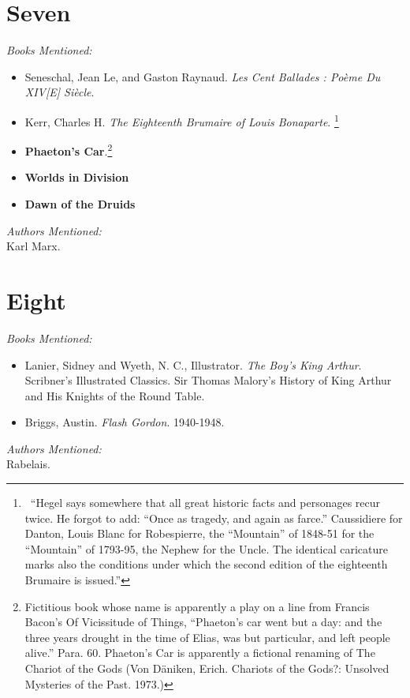 \documentclass[12pt,makeidx]{extreport}
\begin{document}
\section{Seven}
\textit{Books Mentioned:}
\begin{itemize}
\item Seneschal, Jean Le, and Gaston Raynaud. \textit{Les Cent Ballades : Poème Du XIV[E] Siècle}.  \cite{Seneschal1905}
\item Kerr, Charles H. \textit{The Eighteenth Brumaire of Louis Bonaparte}. \cite{Kerr1907}\footnote{\ ``Hegel says somewhere that all great historic facts and personages recur twice. He forgot to add: ``Once as tragedy, and again as farce.'' Caussidiere for Danton, Louis Blanc for Robespierre, the ``Mountain'' of 1848-51 for the ``Mountain'' of 1793-95, the Nephew for the Uncle. The identical caricature marks also the conditions under which the second edition of the eighteenth Brumaire is issued.''}
\item \textbf{Phaeton's Car}.\footnote{Fictitious book whose name is apparently a play on a line from Francis Bacon's Of Vicissitude of Things, ``Phaeton's car went but a day: and the three years drought in the time of Elias, was but particular, and left people alive.'' Para. 60. Phaeton's Car is apparently a fictional renaming of The Chariot of the Gods (Von Däniken, Erich. Chariots of the Gods?: Unsolved Mysteries of the Past. 1973.)\label{phaeton}} \cite{phaeton}
\item \textbf{Worlds in Division} \cite{worldsin} 
\item \textbf{Dawn of the Druids} \cite{druids}
\end{itemize}
\textit{Authors Mentioned:}\\
Karl Marx.

\section{Eight}
\textit{Books Mentioned:}
\begin{itemize}
\item Lanier, Sidney and Wyeth, N. C., Illustrator. \textit{The Boy's King Arthur}. Scribner's Illustrated Classics. Sir Thomas Malory's History of King Arthur and His Knights of the Round Table. \cite{Lanier1937}
\item Briggs, Austin. \textit{Flash Gordon}. 1940-1948. \cite{Briggs1940}
\end{itemize}
\textit{Authors Mentioned:}\\
Rabelais.
\end{document}
